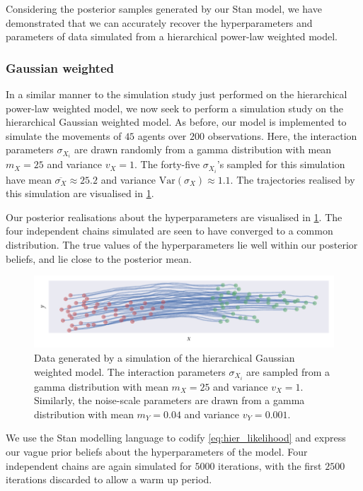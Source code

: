 Considering the posterior samples generated by our Stan model, we have demonstrated that
we can accurately recover the hyperparameters and parameters of data simulated from a
hierarchical power-law weighted model.

\subsubsection{Gaussian weighted}

In a similar manner to the simulation study just performed on the hierarchical power-law
weighted model, we now seek to perform a simulation study on the hierarchical Gaussian
weighted model. As before, our model is implemented to simulate the movements of $45$
agents over $200$ observations. Here, the interaction parameters $\sigma_{X_i}$ are drawn
randomly from a gamma distribution with mean $m_X=25$ and variance $v_X=1$. The forty-five
$\sigma_{X_i}$'s sampled for this simulation have mean $\overline{\sigma_X}\approx25.2$
and variance $\text{Var}(\sigma_X)\approx1.1$. The trajectories realised by this
simulation are visualised in \cref{fig:gauss_hier_sim}.

Our posterior realisations about the hyperparameters are visualised in
\cref{fig:gauss_hier_sim}. The four independent chains simulated are seen to have
converged to a common distribution. The true values of the hyperparameters lie well within
our posterior beliefs, and lie close to the posterior mean.

\begin{figure}[tbp]
  \includegraphics{gauss_hier_sim.pdf}
  \caption{Data generated by a simulation of the hierarchical Gaussian weighted model.
    The interaction parameters $\sigma_{X_i}$ are sampled from a gamma distribution with
    mean $m_X=25$ and variance $v_X=1$. Similarly, the noise-scale parameters are drawn
    from a gamma distribution with mean $m_Y=0.04$ and variance $v_Y=0.001$.} 
  \label{fig:gauss_hier_sim}
\end{figure}

We use the Stan modelling language to codify \cref{eq:hier_likelihood} and express our
vague prior beliefs about the hyperparameters of the model. Four independent chains are
again simulated for $5000$ iterations, with the first $2500$ iterations discarded to allow
a warm up period.


